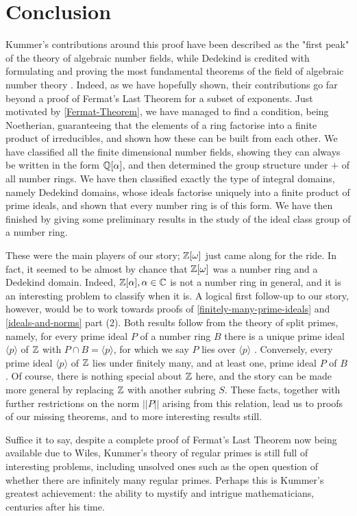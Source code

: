 \chapter{Conclusion}
Kummer's contributions around this proof have been described as the "first peak" \cite{History-algebraic} of the theory of algebraic number fields, while Dedekind is credited with formulating and proving the most fundamental theorems of the field of algebraic number theory \cite{History-algebraic}. Indeed, as we have hopefully shown, their contributions go far beyond a proof of Fermat's Last Theorem for a subset of exponents. Just motivated by \cref{Fermat-Theorem}, we have managed to find a condition, being Noetherian, guaranteeing that the elements of a ring factorise into a finite product of irreducibles, and shown how these can be built from each other. We have classified all the finite dimensional number fields, showing they can always be written in the form $\mathbb{Q}[\alpha]$, and then determined the group structure under $+$ of all number rings. We have then classified exactly the type of integral domains, namely Dedekind domains, whose ideals factorise uniquely into a finite product of prime ideals, and shown that every number ring is of this form. We have then finished by giving some preliminary results in the study of the ideal class group of a number ring.

These were the main players of our story; $\mathbb{Z}[\omega]$ just came along for the ride. In fact, it seemed to be almost by chance that $\mathbb{Z}[\omega]$ was a number ring and a Dedekind domain. Indeed, $\mathbb{Z}[\alpha],\alpha\in \mathbb{C}$ is not a number ring in general, and it is an interesting problem to classify when it is. A logical first follow-up to our story, however, would be to work towards proofs of \cref{finitely-many-prime-ideals} and \cref{ideals-and-norms} part (2). Both results follow from the theory of split primes, namely, for every prime ideal $P$ of a number ring $B$ there is a unique prime ideal $\langle p \rangle$ of $\mathbb{Z}$ with $P\cap B=\langle p \rangle$, for which we say $P$ lies over $\langle p \rangle$ \cite{NumberFields}. Conversely, every prime ideal $\langle p \rangle$ of $\mathbb{Z}$ lies under finitely many, and at least one, prime ideal $P$ of $B$ \cite{NumberFields}. Of course, there is nothing special about $\mathbb{Z}$ here, and the story can be made more general by replacing $\mathbb{Z}$ with another subring $S.$ These facts, together with further restrictions on the norm $||P||$ arising from this relation, lead us to proofs of our missing theorems, and to more interesting results still.

Suffice it to say, despite a complete proof of Fermat's Last Theorem now being available due to Wiles, Kummer's theory of regular primes is still full of interesting problems, including unsolved ones such as the open question of whether there are infinitely many regular primes. Perhaps this is Kummer's greatest achievement: the ability to mystify and intrigue mathematicians, centuries after his time.